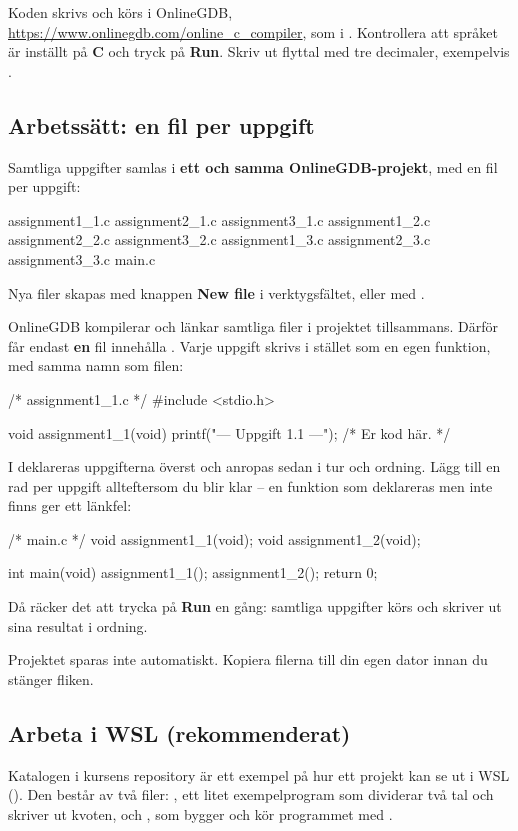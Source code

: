 Koden skrivs och körs i OnlineGDB, \url{https://www.onlinegdb.com/online_c_compiler}, som i
. Kontrollera att språket är inställt på \textbf{C} och tryck på
\textbf{Run}.
Skriv ut flyttal med tre decimaler, exempelvis .

\subsection*{Arbetssätt: en fil per uppgift}
Samtliga uppgifter samlas i \textbf{ett och samma OnlineGDB-projekt}, med en fil per uppgift:
\begin{console}
assignment1_1.c   assignment2_1.c   assignment3_1.c
assignment1_2.c   assignment2_2.c   assignment3_2.c
assignment1_3.c   assignment2_3.c   assignment3_3.c
main.c
\end{console}
Nya filer skapas med knappen \textbf{New file} i verktygsfältet, eller med .

OnlineGDB kompilerar och länkar samtliga filer i projektet tillsammans. Därför får endast
\textbf{en} fil innehålla . Varje uppgift skrivs i stället som en egen funktion,
med samma namn som filen:
\begin{ccode}
/* assignment1_1.c */
#include <stdio.h>

void assignment1_1(void)
{
    printf("--- Uppgift 1.1 ---\n");
    /* Er kod här. */
}
\end{ccode}
I  deklareras uppgifterna överst och anropas sedan i tur och ordning. Lägg till en
rad per uppgift allteftersom du blir klar -- en funktion som deklareras men inte finns ger ett
länkfel:
\begin{ccode}
/* main.c */
void assignment1_1(void);
void assignment1_2(void);

int main(void)
{
    assignment1_1();
    assignment1_2();
    return 0;
}
\end{ccode}
Då räcker det att trycka på \textbf{Run} en gång: samtliga uppgifter körs och
skriver ut sina resultat i ordning.

\begin{aside}
\note[Obs] Projektet sparas inte automatiskt. Kopiera filerna till din egen dator innan du
stänger fliken.
\end{aside}

\subsection*{Arbeta i WSL (rekommenderat)}
Katalogen  i kursens repository är ett exempel på hur ett projekt kan
se ut i WSL (). Den består av två filer: , ett litet
exempelprogram som dividerar två tal och skriver ut kvoten, och , som bygger och
kör programmet med .

